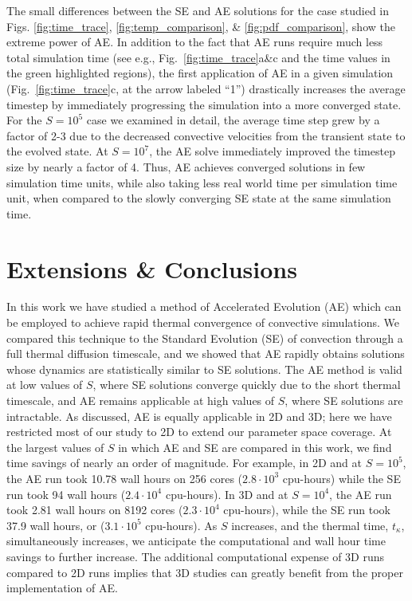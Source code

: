\documentclass[aps, pre, onecolumn, nofootinbib, notitlepage, groupedaddress, amsfonts, amssymb, amsmath, longbibliography]{revtex4-1}
\begin{document}
The small differences between the SE and AE solutions for the case studied in 
Figs. \ref{fig:time_trace}, \ref{fig:temp_comparison}, \& \ref{fig:pdf_comparison},
show the extreme power of AE.  In addition to the fact that AE runs require much
less total simulation time (see e.g., Fig.~\ref{fig:time_trace}a\&c and the time
values in the green highlighted regions), the first application of AE in a given
simulation (Fig.~\ref{fig:time_trace}c, at the arrow labeled ``1'') drastically
increases the average timestep by immediately progressing the simulation into
a more converged state. For the $S = 10^5$ case we examined in detail, the
average time step grew by a factor of 2-3 due to the decreased convective
velocities from the transient state to the evolved state. 
At $S = 10^7$, the AE solve immediately improved the timestep size 
by nearly a factor of 4.
Thus, AE achieves converged solutions in few simulation time units,
while also taking less real world time per simulation time unit, when compared
to the slowly converging SE state at the same simulation time.




\section{Extensions \& Conclusions}
\label{sec:extensions}
In this work we have studied a method of Accelerated Evolution (AE) which can
be employed to achieve rapid thermal convergence of convective simulations.  We compared
this technique to the Standard Evolution (SE) of convection through a full thermal diffusion timescale,
and we
showed that AE rapidly obtains solutions whose dynamics are statistically similar to SE solutions.
The AE method is valid at low values of $S$, where SE solutions
converge quickly due to the short thermal timescale, and AE remains applicable
at high values of $S$, where SE solutions are intractable.
As discussed, AE is equally applicable in 2D and 3D; here we have restricted most of our study to 2D
to extend our parameter space coverage.
At the largest values of $S$ in which AE and SE are compared in this work, we find
time savings of nearly an order of magnitude. 
For example, in 2D and at $S = 10^5$, the
AE run took 10.78 wall hours on 256 cores ($2.8\cdot 10^3$ cpu-hours) while the 
SE run took 94 wall hours ($2.4\cdot 10^4$ cpu-hours). In 3D and at $S = 10^4$,
the AE run took 2.81 wall hours on 8192 cores ($2.3 \cdot 10^4$ cpu-hours),
while the SE run took 37.9 wall hours, or ($3.1 \cdot 10^5$ cpu-hours). As $S$ increases,
and the thermal time, $t_{\kappa}$, simultaneously increases, we anticipate the 
computational and wall hour time
savings to further increase.  The additional computational expense of 3D runs compared
to 2D runs implies that 3D studies can greatly benefit from the proper implementation of AE.
\end{document}
